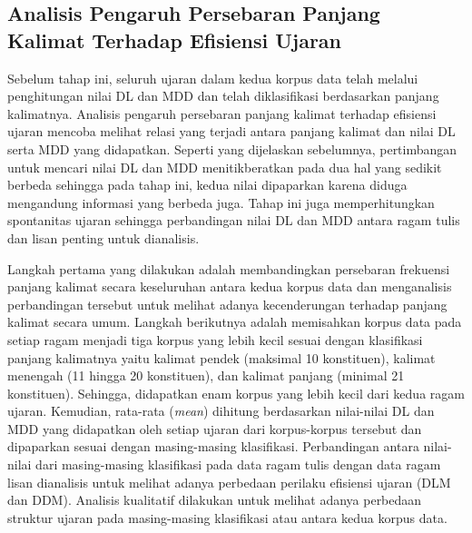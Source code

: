 \subsection{Analisis Pengaruh Persebaran Panjang Kalimat Terhadap Efisiensi Ujaran}
Sebelum tahap ini, seluruh ujaran dalam kedua korpus data telah melalui penghitungan nilai DL dan MDD dan telah diklasifikasi berdasarkan panjang kalimatnya. Analisis pengaruh persebaran panjang kalimat terhadap efisiensi ujaran mencoba melihat relasi yang terjadi antara panjang kalimat dan nilai DL serta MDD yang didapatkan. Seperti yang dijelaskan sebelumnya, pertimbangan untuk mencari nilai DL dan MDD menitikberatkan pada dua hal yang sedikit berbeda sehingga pada tahap ini, kedua nilai dipaparkan karena diduga mengandung informasi yang berbeda juga. Tahap ini juga memperhitungkan spontanitas ujaran sehingga perbandingan nilai DL dan MDD antara ragam tulis dan lisan penting untuk dianalisis. 

Langkah pertama yang dilakukan adalah membandingkan persebaran frekuensi panjang kalimat secara keseluruhan antara kedua korpus data dan menganalisis perbandingan tersebut untuk melihat adanya kecenderungan terhadap panjang kalimat secara umum. Langkah berikutnya adalah memisahkan korpus data pada setiap ragam menjadi tiga korpus yang lebih kecil sesuai dengan klasifikasi panjang kalimatnya yaitu kalimat pendek (maksimal 10 konstituen), kalimat menengah (11 hingga 20 konstituen), dan kalimat panjang (minimal 21 konstituen). Sehingga, didapatkan enam korpus yang lebih kecil dari kedua ragam ujaran. Kemudian, rata-rata (\textit{mean}) dihitung berdasarkan nilai-nilai DL dan MDD yang didapatkan oleh setiap ujaran dari korpus-korpus tersebut dan dipaparkan sesuai dengan masing-masing klasifikasi. Perbandingan antara nilai-nilai dari masing-masing klasifikasi pada data ragam tulis dengan data ragam lisan dianalisis untuk melihat adanya perbedaan perilaku efisiensi ujaran (DLM dan DDM). Analisis kualitatif dilakukan untuk melihat adanya perbedaan struktur ujaran pada masing-masing klasifikasi atau antara kedua korpus data.

